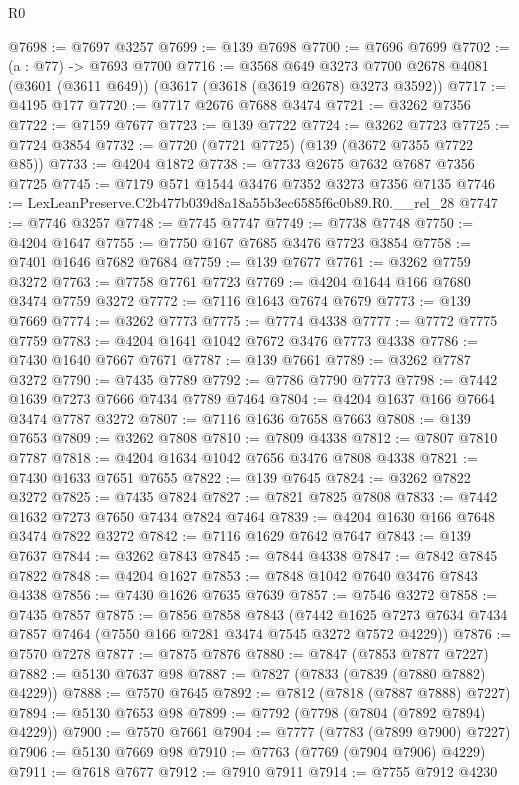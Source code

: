 \begin{lexlean}{R0}
\begin{coremodule}
@7698 := @7697 @3257
@7699 := @139 @7698
@7700 := @7696 @7699
@7702 := (a : @77) -> @7693 @7700
@7716 := @3568
    @649
    @3273
    @7700
    @2678
    @4081
    (@3601 (@3611 @649))
    (@3617 (@3618 (@3619 @2678) @3273 @3592))
@7717 := @4195 @177
@7720 := @7717 @2676 @7688 @3474
@7721 := @3262 @7356
@7722 := @7159 @7677
@7723 := @139 @7722
@7724 := @3262 @7723
@7725 := @7724 @3854
@7732 := @7720 (@7721 @7725) (@139 (@3672 @7355 @7722 @85))
@7733 := @4204 @1872
@7738 := @7733 @2675 @7632 @7687 @7356 @7725
@7745 := @7179 @571 @1544 @3476 @7352 @3273 @7356 @7135
@7746 := LexLeanPreserve.C2b477b039d8a18a55b3ec6585f6c0b89.R0.__rel_28
@7747 := @7746 @3257
@7748 := @7745 @7747
@7749 := @7738 @7748
@7750 := @4204 @1647
@7755 := @7750 @167 @7685 @3476 @7723 @3854
@7758 := @7401 @1646 @7682 @7684
@7759 := @139 @7677
@7761 := @3262 @7759 @3272
@7763 := @7758 @7761 @7723
@7769 := @4204 @1644 @166 @7680 @3474 @7759 @3272
@7772 := @7116 @1643 @7674 @7679
@7773 := @139 @7669
@7774 := @3262 @7773
@7775 := @7774 @4338
@7777 := @7772 @7775 @7759
@7783 := @4204 @1641 @1042 @7672 @3476 @7773 @4338
@7786 := @7430 @1640 @7667 @7671
@7787 := @139 @7661
@7789 := @3262 @7787 @3272
@7790 := @7435 @7789
@7792 := @7786 @7790 @7773
@7798 := @7442 @1639 @7273 @7666 @7434 @7789 @7464
@7804 := @4204 @1637 @166 @7664 @3474 @7787 @3272
@7807 := @7116 @1636 @7658 @7663
@7808 := @139 @7653
@7809 := @3262 @7808
@7810 := @7809 @4338
@7812 := @7807 @7810 @7787
@7818 := @4204 @1634 @1042 @7656 @3476 @7808 @4338
@7821 := @7430 @1633 @7651 @7655
@7822 := @139 @7645
@7824 := @3262 @7822 @3272
@7825 := @7435 @7824
@7827 := @7821 @7825 @7808
@7833 := @7442 @1632 @7273 @7650 @7434 @7824 @7464
@7839 := @4204 @1630 @166 @7648 @3474 @7822 @3272
@7842 := @7116 @1629 @7642 @7647
@7843 := @139 @7637
@7844 := @3262 @7843
@7845 := @7844 @4338
@7847 := @7842 @7845 @7822
@7848 := @4204 @1627
@7853 := @7848 @1042 @7640 @3476 @7843 @4338
@7856 := @7430 @1626 @7635 @7639
@7857 := @7546 @3272
@7858 := @7435 @7857
@7875 := @7856
    @7858
    @7843
    (@7442 @1625 @7273 @7634 @7434 @7857 @7464 (@7550 @166 @7281 @3474 @7545 @3272 @7572 @4229))
@7876 := @7570 @7278
@7877 := @7875 @7876
@7880 := @7847 (@7853 @7877 @7227)
@7882 := @5130 @7637 @98
@7887 := @7827 (@7833 (@7839 (@7880 @7882) @4229))
@7888 := @7570 @7645
@7892 := @7812 (@7818 (@7887 @7888) @7227)
@7894 := @5130 @7653 @98
@7899 := @7792 (@7798 (@7804 (@7892 @7894) @4229))
@7900 := @7570 @7661
@7904 := @7777 (@7783 (@7899 @7900) @7227)
@7906 := @5130 @7669 @98
@7910 := @7763 (@7769 (@7904 @7906) @4229)
@7911 := @7618 @7677
@7912 := @7910 @7911
@7914 := @7755 @7912 @4230

\end{coremodule}
\end{lexlean}
